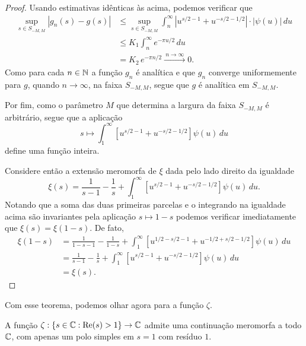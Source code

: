 \begin{proof}
        Usando estimativas idênticas às acima, 
        podemos verificar que 
        \begin{align*}
            \sup_{s\in S_{-M,M}} |g_n(s) - g(s)| 
            &\leq 
            \sup_{s\in S_{-M,M}}
            \int_n^{\infty} \left| u^{s/2 - 1} + u^{-s/2 - 1/2} \right|\cdot|\psi(u)| \, du 
            \\[0.3cm]
            &\leq 
            K_1\int_n^{\infty} e^{-\pi u/2} \, du 
            \\
            &= 
            K_2\, e^{-\pi n/2} 
            \xrightarrow{\ n\to\infty\ } 0.
        \end{align*}
        Como para cada $n\in\mathbb{N}$ a função $g_n$ é analítica e que $g_n$ converge uniformemente para $g$,
        quando $n\to\infty$, na faixa $S_{-M, M}$, segue que
        $g$ é analítica em $S_{-M, M}$. 
        
        Por fim, como o parâmetro $M$ que determina a largura da faixa $S_{-M,M}$ é arbitrário, segue que a aplicação
        \begin{equation}
        \label{eq-aux1-cont-analitica-xi}
        s 
        \longmapsto 
        \int_1^{\infty} \left[ u^{s/2 - 1} + u^{-s/2 - 1/2} \right] \psi(u) \, du
        \end{equation}
        define uma função inteira.
        
        Considere então a extensão meromorfa de $\xi$ dada pelo lado direito da igualdade
        \[
        \xi(s) = \frac{1}{s-1} - \frac{1}{s} + \int_1^{\infty} [u^{s/2 - 1} + u^{-s/2 - 1/2}]\psi(u) \, du.
        \]
        Notando que a soma das duas primeiras parcelas e o integrando na igualdade acima são invariantes pela aplicação $s\longmapsto 1-s$ podemos verificar  imediatamente que $\xi(s) = \xi(1-s)$. De fato, 
        \begin{align*}
            \xi(1-s) &= \frac{1}{1-s-1} - \frac{1}{1-s} 
            + \int_1^{\infty} [u^{1/2 - s/2 - 1} + u^{-1/2 + s/2 - 1/2}]\psi(u) \, du \\
            &= \frac{1}{s-1} - \frac{1}{s} + \int_1^{\infty} [u^{s/2 - 1} + u^{-s/2 - 1/2}]\psi(u) \, du \\
            &= \xi(s).
        \end{align*}
    \end{proof}
    Com esse teorema, podemos olhar agora para a função $\zeta$.
    \begin{teorema}
    \label{teo-cont-zeta}
        A função $\zeta:\{ s\in\mathbb{C} : \mathrm{Re}(s) > 1 \} \to \mathbb{C}$ admite uma continuação meromorfa a todo $\mathbb{C}$,
        com apenas um polo simples em $s=1$ com resíduo $1$.
    \end{teorema}
